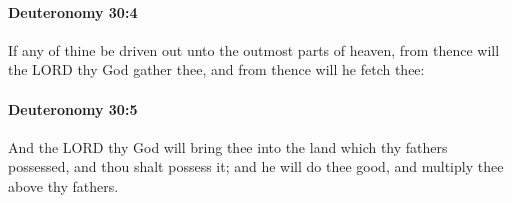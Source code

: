		\paragraph{Deuteronomy 30:4} %
			\label{DEUTERONOMY-30-4}

			If any of thine be driven out unto the outmost parts of heaven, from thence will the LORD thy God gather thee, and from thence will he fetch thee:


		\paragraph{Deuteronomy 30:5} %
			\label{DEUTERONOMY-30-5}

			And the LORD thy God will bring thee into the land which thy fathers possessed, and thou shalt possess it; and he will do thee good, and multiply thee above thy fathers.


